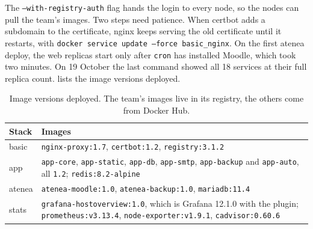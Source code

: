The \texttt{--with-registry-auth} flag hands the login to every node, so
the nodes can pull the team's images. Two steps need patience. When
certbot adds a subdomain to the certificate, nginx keeps serving the old
certificate until it restarts, with
\texttt{docker service update --force basic\_nginx}. On the first atenea
deploy, the web replicas start only after \texttt{cron} has installed
Moodle, which took two minutes. On 19 October the last command showed
all 18 services at their full replica count.  lists
the image versions deployed.

\begin{table}[htbp]
  \centering
  \caption{Image versions deployed. The team's images live in its
    registry, the others come from Docker Hub.}
  \label{tab:versions}
  \small
  \begin{tabular}{l>{\raggedright\arraybackslash}p{105mm}}
    \toprule
    Stack  & Images \\
    \midrule
    basic  & \texttt{nginx-proxy:1.7}, \texttt{certbot:1.2}, \texttt{registry:3.1.2} \\
    app    & \texttt{app-core}, \texttt{app-static}, \texttt{app-db}, \texttt{app-smtp},
             \texttt{app-backup} and \texttt{app-auto}, all \texttt{1.2};
             \texttt{redis:8.2-alpine} \\
    atenea & \texttt{atenea-moodle:1.0}, \texttt{atenea-backup:1.0}, \texttt{mariadb:11.4} \\
    stats  & \texttt{grafana-hostoverview:1.0}, which is Grafana 12.1.0 with the
             plugin; \texttt{prometheus:v3.13.4}, \texttt{node-exporter:v1.9.1},
             \texttt{cadvisor:0.60.6} \\
    \bottomrule
  \end{tabular}
\end{table}
